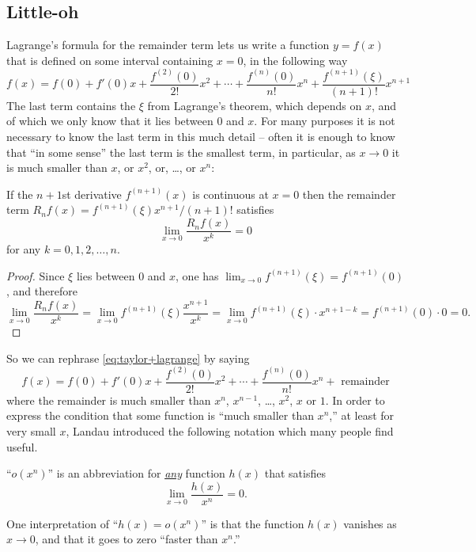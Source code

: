 \subsection{Little-oh} %
\label{sec:little-oh}

Lagrange's formula for the remainder term lets us write a function
$y=f(x)$ that is defined on some interval containing $x=0$, in the
following way
\begin{equation}
  \label{eq:taylor+lagrange}
  f(x) = f(0) + f'(0)x + \frac{f^{(2)}(0)}{2!} x^2 + \cdots 
  + \frac{f^{(n)}(0)}{n!} x^n
  + \frac{f^{(n+1)}(\xi)}{(n+1)!} x^{n+1}
\end{equation}
The last term contains the $\xi$ from Lagrange's theorem, which depends on
$x$, and of which we  only know that it lies between $0$ and $x$.  For many
purposes it is not necessary to know the last term in this much detail --
often it is enough to know that ``in some sense'' the last term is the
smallest term, in particular, as $x\to0$ it is much smaller than $x$, or
$x^2$, or, \ldots, or $x^n$:
\begin{theorem}
  If the $n+1$st derivative $f^{(n+1)}(x)$ is continuous at $x=0$ then the
  remainder term $R_nf(x) = f^{(n+1)}(\xi)x^{n+1}/(n+1)!$ satisfies
  \[
  \lim_{x\to 0} \frac{R_nf(x)}{x^k} = 0
  \]
  for any $k=0, 1, 2, \ldots, n$.
\end{theorem}
\begin{proof}
  Since $\xi$ lies between $0$ and $x$, one has $\lim_{x\to
  0}{f^{(n+1)}(\xi)} = f^{(n+1)}(0)$, and therefore
  \[
  \lim_{x\to 0} \frac{R_nf(x)}{x^k} = \lim_{x\to0} f^{(n+1)}(\xi)
  \frac{x^{n+1}}{x^k} = \lim_{x\to 0} f^{(n+1)}(\xi)\cdot x^{n+1-k} =
  f^{(n+1)}(0)\cdot 0 = 0.
  \]
\end{proof}

So we can rephrase \eqref{eq:taylor+lagrange} by saying
\[
f(x) = f(0) + f'(0)x + \frac{f^{(2)}(0)}{2!} x^2 + \cdots +
\frac{f^{(n)}(0)}{n!} x^n +\text{ remainder}
\]
where the remainder is much smaller than $x^n$, $x^{n-1}$, \dots, $x^2$,
$x$ or $1$.  In order to express the condition that some function is ``much
smaller than $x^n$,'' at least for very small $x$, Landau introduced the
following notation which many people find useful.

\begin{definition}
  ``$o (x^n)$'' is an abbreviation for \underline{\emph{any}} function $h(x)$ that satisfies
  \[
  \lim_{x\to0} \frac{h(x)}{x^n} = 0.
  \]
\end{definition}%
One interpretation of ``$h(x) = o(x^n)$'' is that the function $h(x)$ vanishes
as $x\to0$, and that it goes to zero ``faster than $x^n$.''

